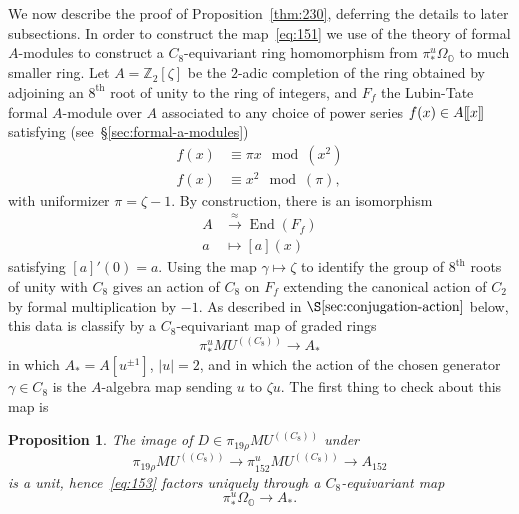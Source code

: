 \documentclass{amsart}
\newtheorem{prop}[equation]{Proposition}
\theoremstyle{definition}
\theoremstyle{remark}
\newcommand{\Z}{{\mathbb Z}}
\newcommand{\LL}{[\mkern-2mu[}
\newcommand{\RR}{]\mkern-2mu]}
\DeclareMathOperator{\Endo}{End}
\newcommand{\mutn}[1]{MU^{(\!(#1)\!)}}
\newcommand{\piu}{\pi^{u}}
\newcommand{\zt}{C_{2}}
\newcommand{\ze}{C_{8}}
\newcommand{\premagic}{\Omega_{\mathbb{O}}}
\newcommand{\ltgroup}{F_{f}}
\begin{document}
We now describe the proof of Proposition~\ref{thm:230}, deferring the
details to later subsections.  In order to construct the
map~\eqref{eq:151} we use of the theory of formal $A$-modules to
construct a $\ze$-equivariant ring homomorphism from
$\piu_{\ast}\premagic$ to much smaller ring.  Let $A=\Z_{2}[\zeta]$ be
the $2$-adic completion of the ring obtained by adjoining an
$8^{\text{th}}$ root of unity to the ring of integers, and $\ltgroup$
the Lubin-Tate formal $A$-module over $A$ associated to any  choice
of power series $f(x)\in A\LL x\RR$ satisfying (see~\S\ref{sec:formal-a-modules})
\begin{align*}
f(x) &\equiv \pi x \mod (x^{2}) \\
f(x) &\equiv x^{2} \mod (\pi),
\end{align*}
with uniformizer $\pi=\zeta-1$.  By construction, there is an isomorphism
\begin{align*}
A &\xrightarrow{\approx}{} \Endo(\ltgroup) \\
a &\mapsto [a](x)
\end{align*}
satisfying $[a]'(0)=a$.  Using the map $\gamma\mapsto \zeta$ to
identify the group of $8^{\text{th}}$ roots of unity with $\ze$ gives
an action of $\ze$ on $\ltgroup$ extending the canonical action of
$\zt$ by formal multiplication by $-1$.  As described in
$\S\ref{sec:conjugation-action}$ below, this data is classify by a
$\ze$-equivariant map of graded rings
\begin{equation}
\label{eq:153}
\piu_{\ast}\mutn{\ze}\to A_{\ast}
\end{equation}
in which $A_{\ast}=A[u^{\pm1}]$, $|u|=2$, and in which the action of
the chosen generator $\gamma\in\ze$ is the $A$-algebra map sending $u$
to $\zeta u$.  The first thing to check about this map is
\begin{prop}
\label{thm:239}
The image of $D\in\pi_{19\rho}\mutn{\ze}$ under
\[
\pi_{19\rho}\mutn{\ze} \to \piu_{152} \mutn{\ze} \to A_{152}
\]
is a unit, hence~\eqref{eq:153} factors uniquely through a
$\ze$-equivariant map
\begin{equation}
\label{eq:155}
\piu_{\ast}\premagic\to A_{\ast}.
\end{equation}
\end{prop}
\end{document}
